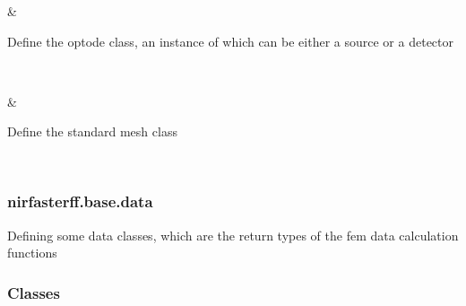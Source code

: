 \documentclass[letterpaper,10pt,english]{sphinxmanual}
\begin{document}
\begin{savenotes}
\begin{longtable}{}
\begin{varwidth}[t]{}
{\hyperref[\detokenize{_autosummary/nirfasterff.base.optodes:module-nirfasterff.base.optodes}]{}}
\sphinxbeforeendvarwidth
\end{varwidth}%
&\begin{varwidth}[t]{}
\sphinxAtStartPar
Define the optode class, an instance of which can be either a source or a detector
\sphinxbeforeendvarwidth
\end{varwidth}%
\\
\sphinxhline\begin{varwidth}[t]{}
\sphinxAtStartPar
{\hyperref[\detokenize{_autosummary/nirfasterff.base.stnd_mesh:module-nirfasterff.base.stnd_mesh}]{}}
\sphinxbeforeendvarwidth
\end{varwidth}%
&\begin{varwidth}[t]{}
\sphinxAtStartPar
Define the standard mesh class
\sphinxbeforeendvarwidth
\end{varwidth}%
\\
\sphinxbottomrule
\end{longtable}
\sphinxtableafterendhook
\sphinxatlongtableend
\end{savenotes}

\sphinxstepscope


\subsubsection{nirfasterff.base.data}
\label{\detokenize{_autosummary/nirfasterff.base.data:module-nirfasterff.base.data}}\label{\detokenize{_autosummary/nirfasterff.base.data:nirfasterff-base-data}}\label{\detokenize{_autosummary/nirfasterff.base.data::doc}}
\sphinxAtStartPar
Defining some data classes, which are the return types of the fem data calculation functions
\subsubsection*{Classes}
\end{document}
